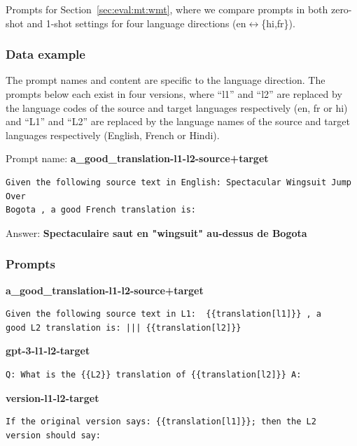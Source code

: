 \documentclass[twoside,11pt]{article}
\begin{document}
Prompts for Section~\ref{sec:eval:mt:wmt}, where we compare prompts in both zero-shot and 1-shot settings for four language directions (en$\leftrightarrow$\{hi,fr\}).

\subsubsection{Data example}

The prompt names and content are specific to the language direction. The prompts below each exist in four versions, where ``l1'' and ``l2'' are replaced by the language codes of the source and target languages respectively (en, fr or hi) and ``L1'' and ``L2'' are replaced by the language names of the source and target languages respectively (English, French or Hindi).

Prompt name: \textbf{a\_good\_translation-l1-l2-source+target}
\begin{verbatim}
Given the following source text in English: Spectacular Wingsuit Jump Over 
Bogota , a good French translation is:
\end{verbatim}
Answer: \textbf{Spectaculaire saut en "wingsuit" au-dessus de Bogota}

\subsubsection{Prompts}

\textbf{a\_good\_translation-l1-l2-source+target}
\begin{verbatim}
Given the following source text in L1:  {{translation[l1]}} , a 
good L2 translation is: ||| {{translation[l2]}}
\end{verbatim}

\noindent\textbf{gpt-3-l1-l2-target}
\begin{verbatim}
Q: What is the {{L2}} translation of {{translation[l2]}} A:
\end{verbatim}

\noindent\textbf{version-l1-l2-target}
\begin{verbatim}
If the original version says: {{translation[l1]}}; then the L2 
version should say:
\end{verbatim}
\end{document}
